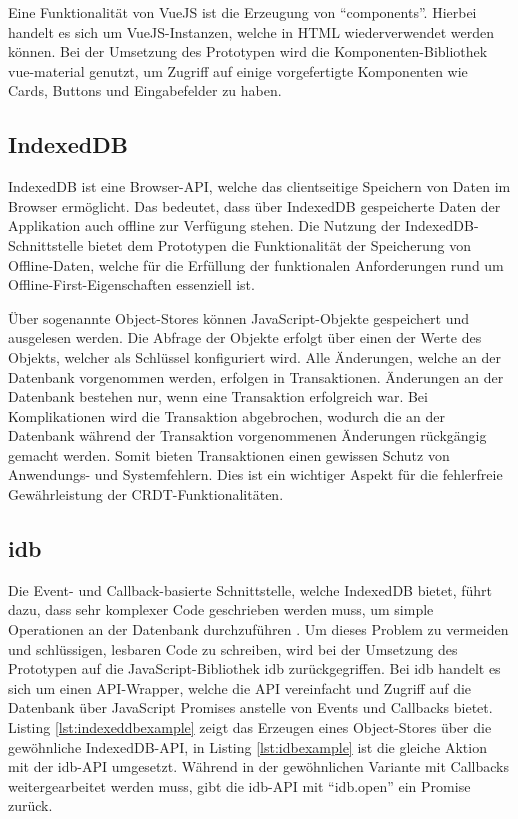 \documentclass[a4paper, 12pt]{scrreprt}
\begin{document}
Eine Funktionalität von VueJS ist die Erzeugung von \enquote{components}. Hierbei handelt es sich um VueJS-Instanzen, welche in HTML wiederverwendet werden können. Bei der Umsetzung des Prototypen wird die Komponenten-Bibliothek vue-material genutzt, um Zugriff auf einige vorgefertigte Komponenten wie Cards, Buttons und Eingabefelder zu haben. 
\subsection{IndexedDB}
IndexedDB ist eine Browser-API, welche das clientseitige Speichern von Daten im Browser ermöglicht. Das bedeutet, dass über IndexedDB gespeicherte Daten der Applikation auch offline zur Verfügung stehen. Die Nutzung der IndexedDB-Schnittstelle bietet dem Prototypen die Funktionalität der Speicherung von Offline-Daten, welche für die Erfüllung der funktionalen Anforderungen rund um Offline-First-Eigenschaften essenziell ist. 

Über sogenannte Object-Stores können JavaScript-Objekte gespeichert und ausgelesen werden. Die Abfrage der Objekte erfolgt über einen der Werte des Objekts, welcher als Schlüssel konfiguriert wird. Alle Änderungen, welche an der Datenbank vorgenommen werden, erfolgen in Transaktionen. Änderungen an der Datenbank bestehen nur, wenn eine Transaktion erfolgreich war. Bei Komplikationen wird die Transaktion abgebrochen, wodurch die an der Datenbank während der Transaktion vorgenommenen Änderungen rückgängig gemacht werden. Somit bieten Transaktionen einen gewissen Schutz von Anwendungs- und Systemfehlern. Dies ist ein wichtiger Aspekt für die fehlerfreie Gewährleistung der CRDT-Funktionalitäten.
\subsection{idb}
\label{sec:idb}
Die Event- und Callback-basierte Schnittstelle, welche IndexedDB bietet, führt dazu, dass sehr komplexer Code geschrieben werden muss, um simple Operationen an der Datenbank durchzuführen \autocite{InproceedingsIDBdoof}. Um dieses Problem zu vermeiden und schlüssigen, lesbaren Code zu schreiben, wird bei der Umsetzung des Prototypen auf die JavaScript-Bibliothek idb zurückgegriffen. Bei idb handelt es sich um einen API-Wrapper, welche die API vereinfacht und Zugriff auf die Datenbank über JavaScript Promises anstelle von Events und Callbacks bietet. Listing \ref{lst:indexeddbexample} zeigt das Erzeugen eines Object-Stores über die gewöhnliche IndexedDB-API, in Listing \ref{lst:idbexample} ist die gleiche Aktion mit der idb-API umgesetzt. Während in der gewöhnlichen Variante mit Callbacks weitergearbeitet werden muss, gibt die idb-API mit \enquote{idb.open} ein Promise zurück.
\end{document}
